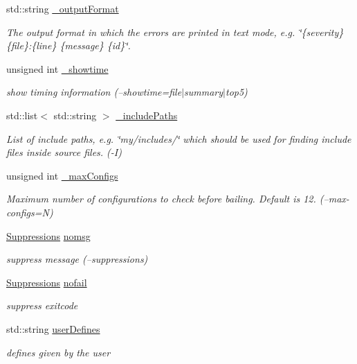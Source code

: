 \begin{DoxyCompactItemize}
std\-::string \hyperlink{class_settings_ac28b2437de15405caeaa89dce1c2a669}{\-\_\-output\-Format}
\begin{DoxyCompactList}\small\item\em The output format in which the errors are printed in text mode, e.\-g. \char`\"{}\{severity\} \{file\}\-:\{line\} \{message\} \{id\}\char`\"{}. \end{DoxyCompactList}\item 
unsigned int \hyperlink{class_settings_a2b369b09fa11c6488c96c3843bb19e83}{\-\_\-showtime}
\begin{DoxyCompactList}\small\item\em show timing information (--showtime=file$|$summary$|$top5) \end{DoxyCompactList}\item 
std\-::list$<$ std\-::string $>$ \hyperlink{class_settings_ad9a5e9c7ab0ad1ea6b6d87fe1486b69d}{\-\_\-include\-Paths}
\begin{DoxyCompactList}\small\item\em List of include paths, e.\-g. \char`\"{}my/includes/\char`\"{} which should be used for finding include files inside source files. (-\/\-I) \end{DoxyCompactList}\item 
unsigned int \hyperlink{class_settings_ab7e1b0a42a74f4203816663f878b3db2}{\-\_\-max\-Configs}
\begin{DoxyCompactList}\small\item\em Maximum number of configurations to check before bailing. Default is 12. (--max-\/configs=N) \end{DoxyCompactList}\item 
\hyperlink{class_suppressions}{Suppressions} \hyperlink{class_settings_aa34b7eef61a5ff9f98f1bfbbfca31a08}{nomsg}
\begin{DoxyCompactList}\small\item\em suppress message (--suppressions) \end{DoxyCompactList}\item 
\hyperlink{class_suppressions}{Suppressions} \hyperlink{class_settings_a9bdd97a6626124e38b19503b9fd7a6f0}{nofail}
\begin{DoxyCompactList}\small\item\em suppress exitcode \end{DoxyCompactList}\item 
std\-::string \hyperlink{class_settings_a8829507f5f2c8bbc1717169ba21edabd}{user\-Defines}
\begin{DoxyCompactList}\small\item\em defines given by the user \end{DoxyCompactList}\item 

\end{DoxyCompactItemize}
